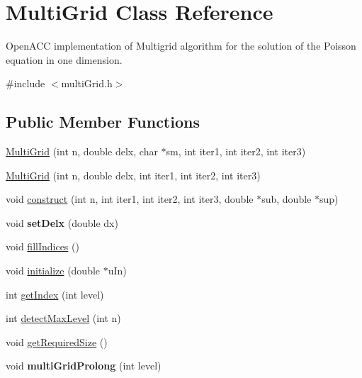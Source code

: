 \hypertarget{classMultiGrid}{}\section{Multi\+Grid Class Reference}
\label{classMultiGrid}


Open\+A\+CC implementation of Multigrid algorithm for the solution of the Poisson equation in one dimension.  




{\ttfamily \#include $<$multi\+Grid.\+h$>$}

\subsection*{Public Member Functions}
\begin{DoxyCompactItemize}
\item 
\mbox{\hyperlink{classMultiGrid_ae0bd1f5ad888a0b0791674d3273343f6}{Multi\+Grid}} (int n, double delx, char $\ast$sm, int iter1, int iter2, int iter3)
\item 
\mbox{\hyperlink{classMultiGrid_a5828418459e380cab698e100f046d69b}{Multi\+Grid}} (int n, double delx, int iter1, int iter2, int iter3)
\item 
void \mbox{\hyperlink{classMultiGrid_aa63b0787973db9e19fa207b1be21a2d8}{construct}} (int n, int iter1, int iter2, int iter3, double $\ast$sub, double $\ast$sup)
\item 
\mbox{\label{classMultiGrid_a5878f45adf5383346fd11bda649eba1f}} 
void {\bfseries set\+Delx} (double dx)
\item 
void \mbox{\hyperlink{classMultiGrid_a48269b6f9aa35ef98dbb6f963d4fc34a}{fill\+Indices}} ()
\item 
void \mbox{\hyperlink{classMultiGrid_a06c1e2774135f580e24438153f0ed8d6}{initialize}} (double $\ast$u\+In)
\item 
int \mbox{\hyperlink{classMultiGrid_a817929f266a2f1c00b6e42516cf3dd96}{get\+Index}} (int level)
\item 
int \mbox{\hyperlink{classMultiGrid_a0e184d70b17678ceb6707a8ddd7e6c87}{detect\+Max\+Level}} (int n)
\item 
void \mbox{\hyperlink{classMultiGrid_a0de44b871082fcd11fc75a97295c2d52}{get\+Required\+Size}} ()
\item 
\mbox{\label{classMultiGrid_a2f1c7cba61d50bb37ed3bf402949031d}} 
void {\bfseries multi\+Grid\+Prolong} (int level)

\end{DoxyCompactItemize}
